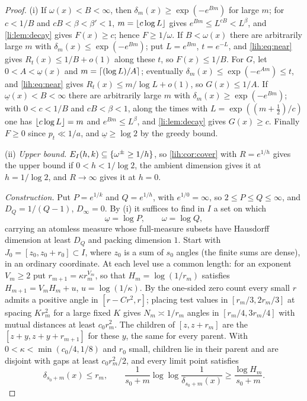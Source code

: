\begin{proof}
(i) If $\omega(x)<B<\infty$, then $\delta_m(x)\ge\exp(-e^{Bm})$ for large $m$; for $c<1/B$ and $cB<\beta<\beta'<1$,
$m=\lfloor c\log L\rfloor$ gives $e^{Bm}\le L^{cB}<L^\beta$, and \cref{li:lem:decay} gives $F(x)\ge c$; hence $F\ge1/\omega$. If
$B<\omega(x)$ there are arbitrarily large $m$ with $\delta_m(x)\le\exp(-e^{Bm})$; put $L=e^{Bm}$, $t=e^{-L}$, and
\eqref{lih:eq:near} gives $R_t(x)\le1/B+o(1)$ along these $t$, so $F(x)\le1/B$. For $G$, let
$0<A<\underline\omega(x)$ and $m=\lceil(\log L)/A\rceil$; eventually $\delta_m(x)\le\exp(-e^{Am})\le t$, and \eqref{lih:eq:near} gives
$R_t(x)\le m/\log L+o(1)$, so $G(x)\le1/A$. If $\underline\omega(x)<B<\infty$ there are arbitrarily large $m$ with
$\delta_m(x)\ge\exp(-e^{Bm})$; with $0<c<1/B$ and $cB<\beta<1$, along the times with $L=\exp((m+\frac12)/c)$ one has
$\lfloor c\log L\rfloor=m$ and $e^{Bm}\le L^\beta$, and \cref{li:lem:decay} gives $G(x)\ge c$. Finally $F\ge0$ since $p_t\ll1/a$,
and $\underline\omega\ge\log2$ by the greedy bound.

(ii) \emph{Upper bound.} $E_I(h,k)\subseteq\{\omega^\pm\ge1/h\}$, so \cref{lih:cor:cover} with $R=e^{1/h}$ gives the
upper bound if $0<h<1/\log2$, the ambient dimension gives it at $h=1/\log2$, and $R\to\infty$ gives it at $h=0$.

\emph{Construction.} Put $P=e^{1/k}$ and $Q=e^{1/h}$, with $e^{1/0}=\infty$, so $2\le P\le Q\le\infty$, and
$D_Q=1/(Q-1)$, $D_\infty=0$. By (i) it suffices to find in $I$ a set on which
\begin{equation}\label{lih:eq:geom}
 \underline\omega=\log P,\qquad\omega=\log Q,
\end{equation}
carrying an atomless measure whose full-measure subsets have Hausdorff dimension at least $D_Q$ and
packing dimension $1$. Start with $J_0=[z_0,z_0+r_0]\subset I$, where $z_0$ is a sum of $s_0$ angles (the finite
sums are dense), in an ordinary coordinate. At each level use a common length: for an exponent
$V_m\ge2$ put $r_{m+1}=\kappa r_m^{V_m}$, so that $H_m=\log(1/r_m)$ satisfies $H_{m+1}=V_mH_m+u$, $u=\log(1/\kappa)$. By the
one-sided zero count every small $r$ admits a positive angle in $[r-Cr^2,r]$; placing test values in
$[r_m/3,2r_m/3]$ at spacing $Kr_m^2$ for a large fixed $K$ gives $N_m\asymp1/r_m$ angles in $[r_m/4,3r_m/4]$
with mutual distances at least $c_0r_m^2$. The children of $[z,z+r_m]$ are the $[z+y,z+y+r_{m+1}]$ for these
$y$, the same for every parent. With $0<\kappa<\min(c_0/4,1/8)$ and $r_0$ small, children lie in their
parent and are disjoint with gaps at least $c_0r_m^2/2$, and every limit point satisfies
\begin{equation}\label{lih:eq:treeapprox}
 \delta_{s_0+m}(x)\le r_m,\qquad\frac1{s_0+m}\log\log\frac1{\delta_{s_0+m}(x)}\ge\frac{\log H_m}{s_0+m}.
\end{equation}


\end{proof}
